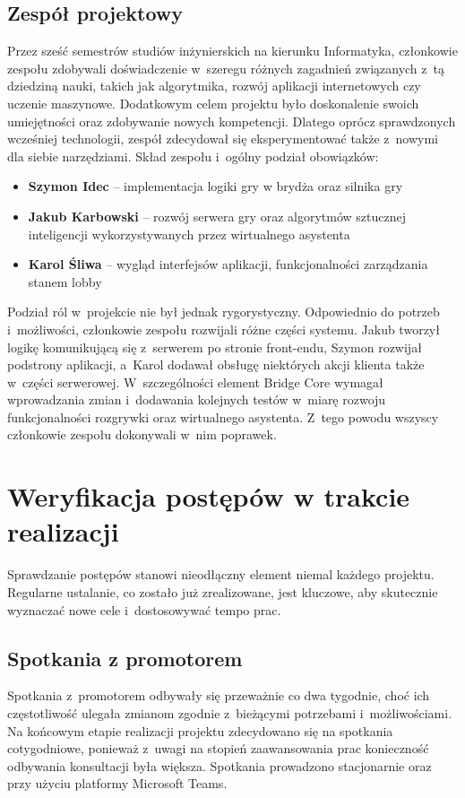 \subsection{Zespół projektowy}
Przez sześć semestrów studiów inżynierskich na kierunku Informatyka, członkowie zespołu zdobywali
doświadczenie w~szeregu różnych zagadnień związanych z~tą dziedziną nauki, takich jak algorytmika,
rozwój aplikacji internetowych czy uczenie maszynowe. Dodatkowym celem projektu było doskonalenie
swoich umiejętności oraz zdobywanie nowych kompetencji. Dlatego oprócz sprawdzonych wcześniej technologii,
zespół zdecydował się eksperymentować także z~nowymi dla siebie narzędziami.
Skład zespołu i~ogólny podział obowiązków:
\begin{itemize}
    \item \textbf{Szymon Idec} -- implementacja logiki gry w brydża oraz silnika gry
    \item \textbf{Jakub Karbowski} -- rozwój serwera gry oraz algorytmów sztucznej inteligencji
          wykorzystywanych przez wirtualnego asystenta
    \item \textbf{Karol Śliwa} -- wygląd interfejsów aplikacji, funkcjonalności zarządzania stanem lobby
\end{itemize}
Podział ról w~projekcie nie był jednak rygorystyczny. Odpowiednio do potrzeb i~możliwości,
członkowie zespołu rozwijali różne części systemu. Jakub tworzył logikę komunikującą się z~serwerem po stronie
front-endu, Szymon rozwijał podstrony aplikacji, a~Karol dodawał obsługę niektórych akcji klienta także w~części
serwerowej. W~szczególności element Bridge Core wymagał wprowadzania zmian i~dodawania kolejnych testów
w~miarę rozwoju funkcjonalności rozgrywki oraz wirtualnego asystenta. Z~tego powodu wszyscy członkowie
zespołu dokonywali w~nim poprawek.


\section{Weryfikacja postępów w trakcie realizacji}

Sprawdzanie postępów stanowi nieodłączny element niemal każdego
projektu. Regularne ustalanie, co zostało już zrealizowane, jest kluczowe,
aby skutecznie wyznaczać nowe cele i~dostosowywać tempo prac.


\subsection{Spotkania z promotorem}
Spotkania z~promotorem odbywały się przeważnie co dwa tygodnie, choć ich częstotliwość
ulegała zmianom zgodnie z~bieżącymi potrzebami i~możliwościami. Na końcowym etapie realizacji projektu zdecydowano
się na spotkania cotygodniowe, ponieważ z~uwagi na stopień zaawansowania prac konieczność odbywania
konsultacji była większa. Spotkania prowadzono stacjonarnie oraz przy użyciu platformy Microsoft Teams.

